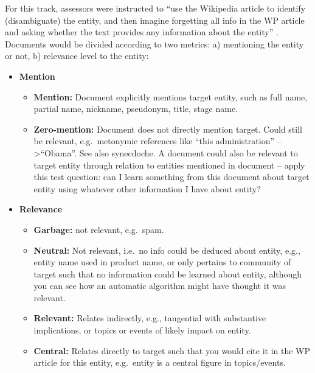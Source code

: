 For this track, assessors were instructed to ``use the Wikipedia article to 
identify (disambiguate) the entity, and then imagine forgetting all info in the WP 
article and asking whether the text provides any information about the entity'' \cite{JFrank12}.
Documents would be divided according to two metrics: a) mentioning the entity or 
not, b) relevance level to the entity:
\begin{itemize}
  \item \textbf{Mention} 
    \begin{itemize}
      \item \textbf{Mention:} Document explicitly mentions target entity, such as full 
        name, partial name, nickname, pseudonym, title, stage name.
      \item \textbf{Zero-mention:} Document does not directly mention target. Could 
        still be relevant, e.g.\ metonymic references like ``this administration'' --
        \textgreater ``Obama''. See also synecdoche. A document could also be relevant to 
        target entity through relation to entities mentioned in document -- apply this 
        test question: can I learn something from this document about target entity using 
        whatever other information I have about entity?
    \end{itemize}
  \item \textbf{Relevance}
    \begin{itemize}
      \item \textbf{Garbage:} not relevant, e.g.\ spam.
      \item \textbf{Neutral:} Not relevant, i.e.\ no info could be deduced about entity, 
        e.g., entity name used in product name, or only pertains to community of target 
        such that no information could be learned about entity, although you can see how 
        an automatic algorithm might have thought it was relevant.
      \item \textbf{Relevant:} Relates indirectly, e.g., tangential with substantive 
        implications, or topics or events of likely
        impact on entity.
      \item \textbf{Central:} Relates directly to target such that you would cite it in 
        the WP article for this entity, e.g.\ entity is a
        central figure in topics/events.

    \end{itemize}
\end{itemize}


